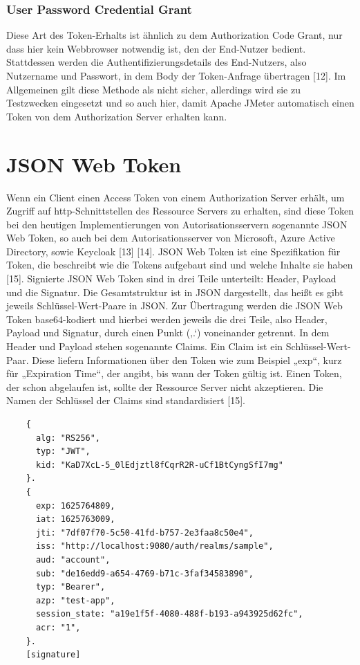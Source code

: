 \subsubsection{User Password Credential Grant}
\label{ssubsec:background:second_section:first_subsection:second_subsubsection}
Diese Art des Token-Erhalts ist ähnlich zu dem Authorization Code Grant, nur dass hier kein Webbrowser notwendig ist, den der End-Nutzer bedient. Stattdessen werden die Authentifizierungsdetails des End-Nutzers, also Nutzername und Passwort, in dem Body der Token-Anfrage übertragen [12]. Im Allgemeinen gilt diese Methode als nicht sicher, allerdings wird sie zu Testzwecken eingesetzt und so auch hier, damit Apache JMeter automatisch einen Token von dem Authorization Server erhalten kann.

\section{JSON Web Token}
\label{sec:background:third_section}
Wenn ein Client einen Access Token von einem Authorization Server erhält, um Zugriff auf http-Schnittstellen des Ressource Servers zu erhalten, sind diese Token bei den heutigen Implementierungen von Autorisationsservern sogenannte \ac{JSON} Web Token, so auch bei dem Autorisationsserver von Microsoft, Azure Active Directory, sowie Keycloak [13] [14]. 
JSON Web Token ist eine Spezifikation für Token, die beschreibt wie die Tokens aufgebaut sind und welche Inhalte sie haben [15].
Signierte JSON Web Token sind in drei Teile unterteilt: Header, Payload und die Signatur. Die Gesamtstruktur ist in JSON dargestellt, das heißt es gibt jeweils Schlüssel-Wert-Paare in JSON. Zur Übertragung werden die JSON Web Token base64-kodiert und hierbei werden jeweils die drei Teile, also Header, Payload und Signatur, durch einen Punkt (‚.‘) voneinander getrennt. 
In dem Header und Payload stehen sogenannte Claims. Ein Claim ist ein Schlüssel-Wert-Paar. Diese liefern Informationen über den Token wie zum Beispiel „exp“, kurz für „Expiration Time“, der angibt, bis wann der Token gültig ist. Einen Token, der schon abgelaufen ist, sollte der Ressource Server nicht akzeptieren. Die Namen der Schlüssel der Claims sind standardisiert [15]. 

\begin{lstlisting}
    {
      alg: "RS256",
      typ: "JWT",
      kid: "KaD7XcL-5_0lEdjztl8fCqrR2R-uCf1BtCyngSfI7mg"
    }.
    {
      exp: 1625764809,
      iat: 1625763009,
      jti: "7df07f70-5c50-41fd-b757-2e3faa8c50e4",
      iss: "http://localhost:9080/auth/realms/sample",
      aud: "account",
      sub: "de16edd9-a654-4769-b71c-3faf34583890",
      typ: "Bearer",
      azp: "test-app",
      session_state: "a19e1f5f-4080-488f-b193-a943925d62fc",
      acr: "1",
    }.
    [signature]    
\end{lstlisting}


